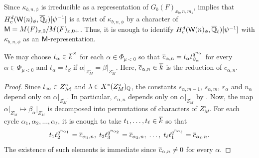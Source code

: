 \documentclass[12pt,reqno]{amsart}
\begin{document}
Since $\kappa_{b, n, \phi}$ is irreducible as a representation of $G_b(F)_{x_b, n, m_b}$,  implies that $H_c^d({\mathsf{W}}(n)_\phi, {\overline{\mathbb{Q}}_\ell})[\psi^{-1}]$ is a twist of $\kappa_{b, n, \phi}$ by a character of ${\mathsf{M}} = M(F)_{x, 0} / M(F)_{x, 0+}$. Thus, it is enough to identify $H_c^d({\mathsf{W}}(n)_\phi, {\overline{\mathbb{Q}}_\ell})[\psi^{-1}]$ with $\kappa_{b, n, \phi}$ as an ${\mathsf{M}}$-representation. 

\begin{lem} \label{lem:normalization_t_factor}
    We may choose $t_\alpha \in {\overline{k}}^\times$ for each $\alpha \in \Phi_{\mu < 0}$ so that ${\overline{c}}_{\alpha, n} = t_\alpha t_{\beta_\alpha}^{q^{n_\alpha}}$ for every $\alpha \in \Phi_{\mu < 0}$ and $t_\alpha = t_\beta$ if $\alpha\vert_{Z_M^\circ} = \beta\vert_{Z_M^\circ}$. Here, ${\overline{c}}_{\alpha, n} \in {\overline{k}}$ is the reduction of $c_{\alpha, n}$. 
\end{lem}
\begin{proof}
    Since $t_\infty \in Z_{{\mathcal{M}}}^\circ$ and $\lambda \in X^*(Z_M^\circ)_{\mathbb{Q}}$, the constants $s_{\alpha, m - 1}$, $s_{\alpha, m}$, $r_\alpha$ and $n_\alpha$ depend only on $\alpha\vert_{Z_M^\circ}$. In particular, $c_{\alpha, n}$ depends only on $\alpha\vert_{Z_M^\circ}$ by . Now, the map $\alpha\vert_{Z_M^\circ} \mapsto \beta_\alpha \vert_{Z_M^\circ}$ is decomposed into permutations of characters of $Z_M^\circ$. For each cycle $\alpha_1, \alpha_2, \ldots, \alpha_\ell$, it is enough to take $t_1,\ldots,t_\ell \in {\overline{k}}$ so that 
    \[
        t_1 t_2^{q^{n_{\alpha_1}}} = {\overline{c}}_{\alpha_1, n}, \; t_2 t_3^{q^{n_{\alpha_2}}} = {\overline{c}}_{\alpha_2, n},\; \ldots,\; t_\ell t_1^{q^{n_{\alpha_\ell}}} = {\overline{c}}_{\alpha_\ell, n}. 
    \]
    The existence of such elements is immediate since ${\overline{c}}_{\alpha, n} \neq 0$ for every $\alpha$. 
\end{proof}
\end{document}
